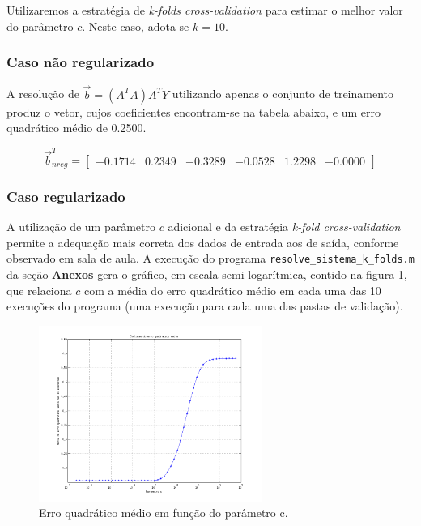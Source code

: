 \vspace{12pt}

Utilizaremos a estratégia de \textit{k-folds cross-validation} para estimar o
melhor valor do parâmetro \(c\). Neste caso, adota-se \(k=10\).

\subsubsection{Caso não regularizado}

A resolução de \(\overrightarrow{b} = \left( A^T A \right) A^T
Y\) utilizando apenas o conjunto de treinamento produz o vetor, cujos
coeficientes encontram-se na tabela abaixo, e um erro quadrático médio de
0.2500.

\[
\overrightarrow{b}_{nreg}^T = \begin{bmatrix}
  -0.1714 & 0.2349 & -0.3289 & -0.0528 & 1.2298 & -0.0000
  \end{bmatrix}
\]

\FloatBarrier
\subsubsection{Caso regularizado}

A utilização de um parâmetro \(c\) adicional e da estratégia \textit{k-fold
cross-validation} permite a adequação mais correta dos dados de entrada aos de
saída, conforme observado em sala de aula. A execução do programa
\texttt{resolve\_sistema\_k\_folds.m} da seção \textbf{Anexos} gera o gráfico,
em escala semi logarítmica, contido na figura \ref{fig:pred.regula}, que
relaciona \(c\) com a média do erro quadrático médio em cada uma das 10
execuções do programa (uma execução para cada uma das pastas de validação).

	\begin{figure}[H]
	  \centering
	  \includegraphics[width=0.65\textwidth]{image/preditor_regularizado_k_folds}
	  \caption{Erro quadrático médio em função do parâmetro c.} 
	  \label{fig:pred.regula}
	\end{figure}
	
